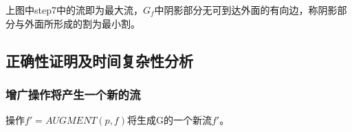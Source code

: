 \begin{figure}[H]
\end{figure}

%
%
%
%

  上图中step7中的流即为最大流，$G_f$中阴影部分无可到达外面的有向边，称阴影部分与外面所形成的割为最小割。

  \subsection{正确性证明及时间复杂性分析}

  \subsubsection{增广操作将产生一个新的流}

  \begin{theorem}%
    操作$f'=AUGMENT(p,f)$将生成G的一个新流$f'$。
  \end{theorem}

